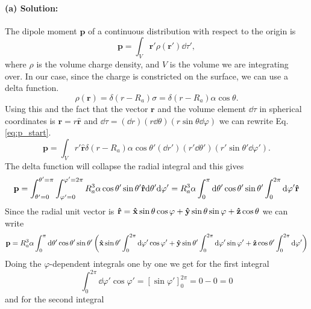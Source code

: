 \paragraph{(a) Solution:} The dipole moment $\mathbf{p}$ of a continuous distribution with respect to the origin is 
\begin{equation}
    \mathbf{p} = \int_V \mathbf{r}' \rho(\mathbf{r}')\dd \tau',\label{eq:p_start}
\end{equation}
where $\rho$ is the volume charge density, and $V$ is the volume we are integrating over. In our case, since the charge is constricted on the surface, we can use a delta function.
\begin{equation}
    \rho(\mathbf{r}) = \delta(r-R_a)\sigma = \delta(r-R_a)\alpha\cos\theta.
\end{equation}
Using this and the fact that the vector $\mathbf{r}$ and the volume element $\dd \tau$ in spherical coordinates is $\mathbf{r} = r\mathbf{\hat{r}}$ and $\dd \tau = (\dd r)(r \dd \theta)(r \sin\theta \dd\varphi)$ we can rewrite Eq. \eqref{eq:p_start}.
\begin{equation}
    \mathbf{p} = \int_V r' \mathbf{\hat{r}}\delta(r-R_a)\alpha\cos\theta'(\dd r')(r' \dd \theta')(r' \sin\theta' \dd\varphi').
\end{equation}
The delta function will collapse the radial integral and this gives
\begin{equation}
    \mathbf{p} =\int_{\theta'=0}^{\theta'=\pi} \int_{\varphi'=0}^{\varphi'=2\pi} R_a^3\alpha \cos\theta' \sin\theta' \mathbf{\hat{r}}\dd\theta' \dd\varphi' = R_a^3 \alpha \int_{0}^{\pi}\dd\theta' \cos\theta' \sin\theta' \int_{0}^{2\pi} \dd\varphi' \mathbf{\hat{r}}
\end{equation}
Since the radial unit vector is $\mathbf{\hat{r}} = \mathbf{\hat{x}} \sin\theta \cos\varphi + \mathbf{\hat{y}} \sin\theta \sin\varphi + \mathbf{\hat{z}} \cos\theta$ we can write
\begin{equation}
    \mathbf{p} = R_a^3 \alpha \int_{0}^{\pi}\dd\theta' \cos\theta' \sin\theta' \left( \mathbf{\hat{x}}\sin\theta' \int_{0}^{2\pi}\dd\varphi' \cos\varphi' + \mathbf{\hat{y}}\sin\theta' \int_{0}^{2\pi}\dd\varphi' \sin\varphi' + \mathbf{\hat{z}}\cos\theta' \int_{0}^{2\pi} \dd\varphi'\right)\label{eq:p_new}
\end{equation}
Doing the $\varphi$-dependent integrals one by one we get for the first integral
\begin{equation}
    \int_{0}^{2\pi}\dd\varphi' \cos\varphi' = [\sin\varphi']_0^{2\pi} = 0 - 0 = 0
\end{equation}
and for the second integral
